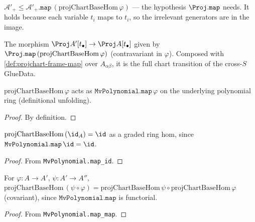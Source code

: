 \begin{lemma}

  \label{lem:projchart-base-hom-irrelevant-le}
  $\mathcal A'_+ \le \mathcal A'_+.\mathtt{map}\,(\mathrm{projChartBaseHom}\,\varphi)$
  — the hypothesis $\Proj.\mathtt{map}$ needs. It holds because each variable $t_i$
  maps to $t_i$, so the irrelevant generators are in the image.
\end{lemma}

\begin{definition}

  \label{def:projchart-base-map}
  The morphism $\Proj A'[t_\bullet]\to\Proj A[t_\bullet]$ given by
  $\Proj.\mathtt{map}\,(\mathrm{projChartBaseHom}\,\varphi)$ (contravariant in
  $\varphi$). Composed with \cref{def:projchart-frame-map} over $A_{\alpha\beta}$,
  it is the full chart transition of the cross-$S$ GlueData.
\end{definition}

\begin{lemma}

  \label{lem:projchart-base-hom-apply}
  $\mathrm{projChartBaseHom}\,\varphi$ acts as $\mathtt{MvPolynomial.map}\,\varphi$
  on the underlying polynomial ring (definitional unfolding).
\end{lemma}
\begin{proof} By definition. \end{proof}

\begin{lemma}

  \label{lem:projchart-base-hom-id}
  $\mathrm{projChartBaseHom}\,(\id_A)=\id$ as a graded ring hom, since
  $\mathtt{MvPolynomial.map}\,\id=\id$.
\end{lemma}
\begin{proof} From \texttt{MvPolynomial.map\_id}. \end{proof}

\begin{lemma}

  \label{lem:projchart-base-hom-comp}
  For $\varphi:A\to A'$, $\psi:A'\to A''$,
  $\mathrm{projChartBaseHom}\,(\psi\circ\varphi)=
  \mathrm{projChartBaseHom}\,\psi\circ\mathrm{projChartBaseHom}\,\varphi$
  (covariant), since $\mathtt{MvPolynomial.map}$ is functorial.
\end{lemma}
\begin{proof} From \texttt{MvPolynomial.map\_map}. \end{proof}


